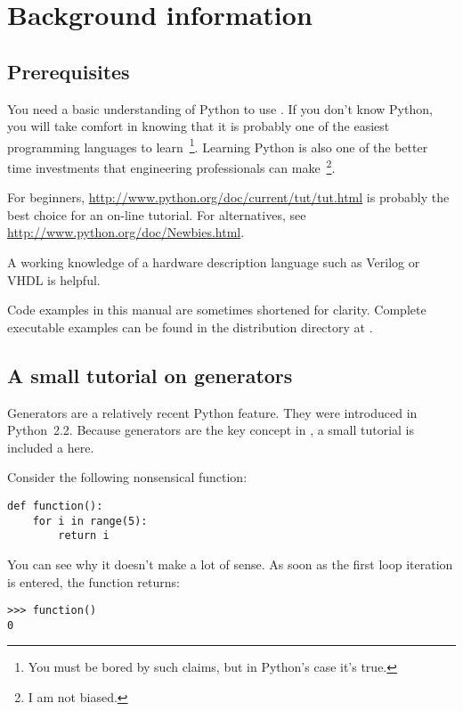 \chapter{Background information \label{background}}

\section{Prerequisites \label{prerequisites}}

You need a basic understanding of Python to use \myhdl{}.
If you don't know Python, you will take comfort in knowing
that it is probably one of the easiest programming languages to
learn~\footnote{You must be bored by such claims, but in Python's
case it's true.}. Learning Python is also one of the better time
investments that engineering professionals can make~\footnote{I am not
biased.}.

For beginners, \url{http://www.python.org/doc/current/tut/tut.html} is
probably the best choice for an on-line tutorial. For alternatives,
see \url{http://www.python.org/doc/Newbies.html}.

A working knowledge of a hardware description language such as Verilog
or VHDL is helpful. 

Code examples in this manual are sometimes shortened for clarity.
 Complete executable examples can be found in the distribution directory at 
.

\section{A small tutorial on generators \label{tutorial}}

Generators are a relatively recent Python feature. They
were introduced in Python~2.2.
Because generators are the key concept in
\myhdl{}, a small tutorial is included a here.

Consider the following nonsensical function:

\begin{verbatim}
def function():
    for i in range(5):
        return i
\end{verbatim}

You can see why it doesn't make a lot of sense. As soon as the first
loop iteration is entered, the function returns:

\begin{verbatim}
>>> function()
0
\end{verbatim}

